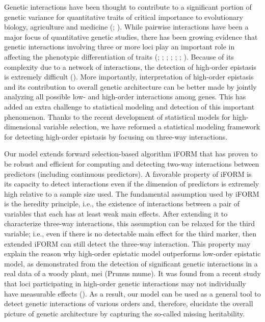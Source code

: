 \documentclass[11pt,]{book}
\theoremstyle{definition}
\theoremstyle{definition}
\theoremstyle{remark}
\begin{document}
Genetic interactions have been thought to contribute to a significant
portion of genetic variance for quantitative traits of critical
importance to evolutionary biology, agriculture and medicine
(\cite{nelson2013century}; \cite{mackay2014epistasis}). While pairwise
interactions have been a major focus of quantitative genetic studies,
there has been growing evidence that genetic interactions involving
three or more loci play an important role in affecting the phenotypic
differentiation of traits (\cite{wang2010general};
\cite{dowell2010genotype}; \cite{pettersson2011replication};
\cite{pang2013statistical}; \cite{weinreich2013should};
\cite{taylor2014genetic}; \cite{taylor2015higher}). Because of its
complexity due to a network of interactions, the detection of high-order
epistasis is extremely difficult (\cite{mackay2014epistasis}). More
importantly, interpretation of high-order epistasis and its contribution
to overall genetic architecture can be better made by jointly analyzing
all possible low- and high-order interactions among genes. This has
added an extra challenge to statistical modeling and detection of this
important phenomenon. Thanks to the recent development of statistical
models for high-dimensional variable selection, we have reformed a
statistical modeling framework for detecting high-order epistasis by
focusing on three-way interactions.

Our model extends \cite{hao2014interaction} forward selection-based
algorithm iFORM that has proven to be robust and efficient for computing
and detecting two-way interactions between predictors (including
continuous predictors). A favorable property of iFORM is its capacity to
detect interactions even if the dimension of predictors is extremely
high relative to a sample size used. The fundamental assumption used by
iFORM is the heredity principle, i.e., the existence of interactions
between a pair of variables that each has at least weak main effects.
After extending it to characterize three-way interactions, this
assumption can be relaxed for the third variable; i.e., even if there is
no detectable main effect for the third marker, then extended iFORM can
still detect the three-way interaction. This property may explain the
reason why high-order epistatic model outperforms low-order epistatic
model, as demonstrated from the detection of significant genetic
interactions in a real data of a woody plant, mei (Prunus mume). It was
found from a recent study that loci participating in high-order genetic
interactions may not individually have measurable effects
(\cite{bloom2013finding}). As a result, our model can be used as a
general tool to detect genetic interactions of various orders and,
therefore, elucidate the overall picture of genetic architecture by
capturing the so-called missing heritability.
\end{document}
